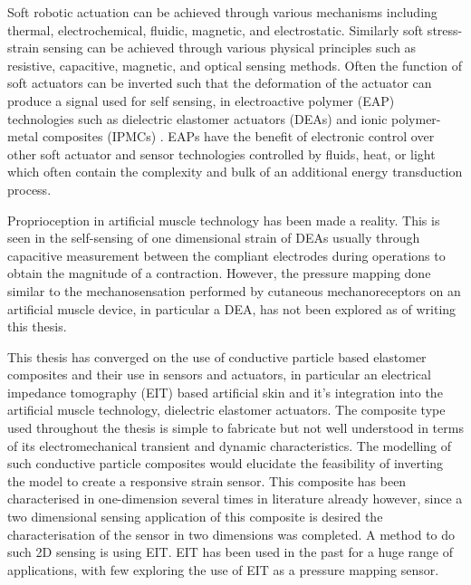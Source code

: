 Soft robotic actuation can be achieved through various mechanisms including thermal, electrochemical, fluidic, magnetic, and electrostatic. Similarly soft stress-strain sensing can be achieved through various physical principles such as resistive, capacitive, magnetic, and optical sensing methods. Often the function of soft actuators can be inverted such that the deformation of the actuator can produce a signal used for self sensing, in electroactive polymer (EAP) technologies such as dielectric elastomer actuators (DEAs) \cite{Gisby2013, Rosset2013, Liu2016, Huang2023} and ionic polymer-metal composites (IPMCs) \cite{MohdIsa2019}. EAPs have the benefit of electronic control over other soft actuator and sensor technologies controlled by fluids, heat, or light which often contain the complexity and bulk of an additional energy transduction process.

Proprioception in artificial muscle technology has been made a reality. This is seen in the self-sensing of one dimensional strain of DEAs usually through capacitive measurement between the compliant electrodes during operations to obtain the magnitude of a contraction. However, the pressure mapping done similar to the mechanosensation performed by cutaneous mechanoreceptors on an artificial muscle device, in particular a DEA, has not been explored as of writing this thesis. 

This thesis has converged on the use of conductive particle based elastomer composites and their use in sensors and actuators, in particular an electrical impedance tomography (EIT) based artificial skin and it's integration into the artificial muscle technology, dielectric elastomer actuators. The composite type used throughout the thesis is simple to fabricate but not well understood in terms of its electromechanical transient and dynamic characteristics. The modelling of such conductive particle composites would elucidate the feasibility of inverting the model to create a responsive strain sensor. This composite has been characterised in one-dimension several times in literature already however, since a two dimensional sensing application of this composite is desired the characterisation of the sensor in two dimensions was completed. A method to do such 2D sensing is using EIT. EIT has been used in the past for a huge range of applications, with few exploring the use of EIT as a pressure mapping sensor.


